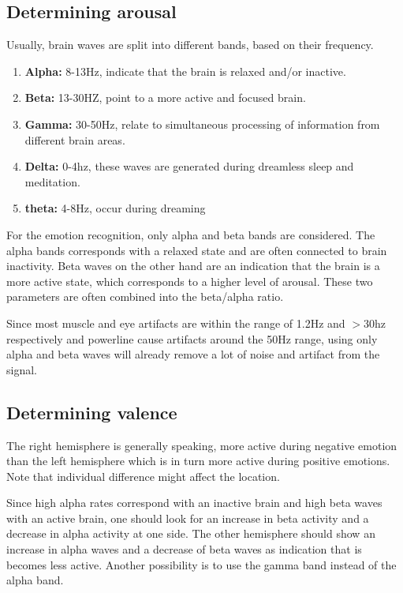 \subsection{Determining arousal}
Usually, brain waves are split into different bands, based on their frequency\cite{EmotionRelativePower}\cite{WavesSite}.
\begin{enumerate}
\item \textbf{Alpha:} 8-13Hz, indicate that the brain is relaxed and/or inactive.
\item \textbf{Beta:} 13-30HZ, point to a more active and focused brain.
\item \textbf{Gamma:} 30-50Hz, relate to simultaneous processing of information from different brain areas.
\item \textbf{Delta:} 0-4hz, these waves are generated during dreamless sleep and meditation.
\item \textbf{theta:} 4-8Hz, occur during dreaming
\end{enumerate}
For the emotion recognition, only alpha and beta bands are considered. The alpha bands corresponds with a relaxed state and are often connected to brain inactivity\cite{ExtendedPaper}\cite{RealTimeEEGEmotion}. Beta waves on the other hand are an indication that the brain is a more active state, which corresponds to a higher level of arousal. These two parameters are often combined into the beta/alpha ratio.

\npar

Since most muscle and eye artifacts are within the range of 1.2Hz and $>$30hz respectively and powerline cause artifacts around the 50Hz range, using only alpha and beta waves will already remove a lot of noise and artifact from the signal\cite{ExtendedPaper}.

\subsection{Determining valence}
The right hemisphere is generally speaking, more active during negative emotion than the left hemisphere which is in turn more active during positive emotions\cite{RealTimeEEGEmotion}\cite{EEGDatasets}. Note that individual difference might affect the location\cite{ExtendedPaper}.

\npar

Since high alpha rates correspond with an inactive brain and high beta waves with an active brain, one should look for an increase in beta activity and a decrease in alpha activity at one side. The other hemisphere should show an increase in alpha waves and a decrease of beta waves as indication that is becomes less active. Another possibility is to use the gamma band instead of the alpha band. 

